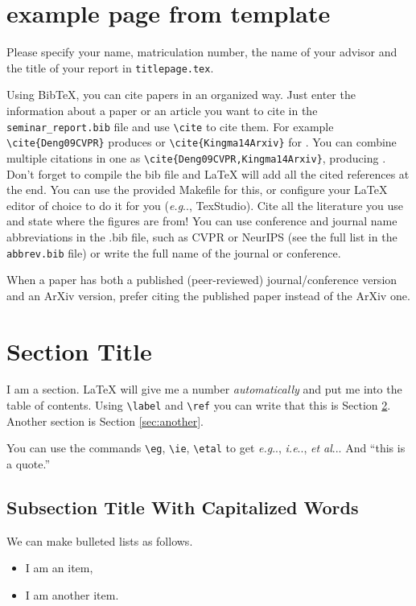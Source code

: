 \documentclass[twoside,a4paper,article]{combine}
\makeatletter
\DeclareRobustCommand\onedot{\futurelet\@let@token\@onedot}
\def\@onedot{\ifx\@let@token.\else.\null\fi\xspace}
\def\eg{\emph{e.g}\onedot} \def\Eg{\emph{E.g}\onedot}
\def\ie{\emph{i.e}\onedot} \def\Ie{\emph{I.e}\onedot}
\def\etal{\emph{et al}\onedot}
\makeatother
\begin{document}
\newpage
\section{example page from template}
Please specify your name, matriculation number, the name of your advisor and the title of your report in 
\verb+titlepage.tex+.

Using BibTeX, you can cite papers in an organized way.
Just enter the information about a paper or an article you want to cite in the \texttt{seminar\_report.bib} file and use \verb+\cite+ to cite them. For example \verb+\cite{Deng09CVPR}+ produces \cite{Deng09CVPR} or \verb+\cite{Kingma14Arxiv}+ for \cite{Kingma14Arxiv}. You can combine multiple citations in one as \verb+\cite{Deng09CVPR,Kingma14Arxiv}+, producing \cite{Deng09CVPR,Kingma14Arxiv}.
Don't forget to compile the bib file and LaTeX will add all the cited references at the end. You can use the provided Makefile for this, or configure your LaTeX editor of choice to do it for you (\eg, TexStudio).
Cite all the literature you use and state where the figures are from! You can use conference and journal name abbreviations in the .bib file, such as CVPR or NeurIPS (see the full list in the \texttt{abbrev.bib} file) or write the full name of the journal or conference.

When a paper has both a published (peer-reviewed) journal/conference version and an ArXiv version, prefer citing the published paper instead of the ArXiv one.

\section{Section Title}
\label{sec:firstsection}
I am a section. LaTeX will give me a number \emph{automatically} and put me into the table of contents.
Using \verb+\label+ and \verb+\ref+ you can write that this is Section \ref{sec:firstsection}. Another section is Section \ref{sec:another}.

You can use the commands \verb+\eg+,  \verb+\ie+,  \verb+\etal+ to get \eg, \ie, \etal. And ``this is a quote.''

\subsection{Subsection Title With Capitalized Words}
We can make bulleted lists as follows.

\begin{itemize}
\item I am an item,
\item I am another item.
\end{itemize}
\end{document}
